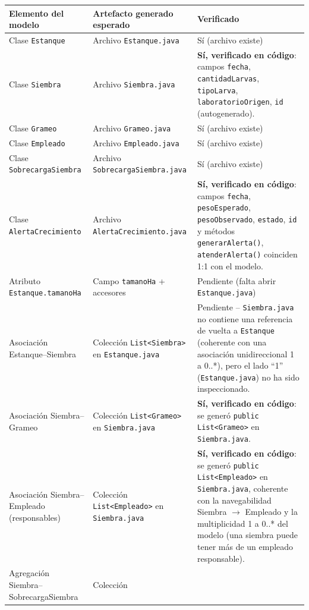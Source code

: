 \documentclass[11pt,a4paper]{article}
\begin{document}
\begin{center}
\begin{tabularx}{\linewidth}{>{\raggedright\arraybackslash}p{3.7cm}XX}
\toprule
\textbf{Elemento del modelo} & \textbf{Artefacto generado esperado} &
\textbf{Verificado} \\
\midrule
Clase \texttt{Estanque} & Archivo \texttt{Estanque.java} & Sí (archivo existe) \\
Clase \texttt{Siembra} & Archivo \texttt{Siembra.java} & \textbf{Sí, verificado
en código}: campos \texttt{fecha}, \texttt{cantidadLarvas}, \texttt{tipoLarva},
\texttt{laboratorioOrigen}, \texttt{id} (autogenerado). \\
Clase \texttt{Grameo} & Archivo \texttt{Grameo.java} & Sí (archivo existe) \\
Clase \texttt{Empleado} & Archivo \texttt{Empleado.java} & Sí (archivo existe) \\
Clase \texttt{SobrecargaSiembra} & Archivo \texttt{SobrecargaSiembra.java} &
Sí (archivo existe) \\
Clase \texttt{AlertaCrecimiento} & Archivo \texttt{AlertaCrecimiento.java} &
\textbf{Sí, verificado en código}: campos \texttt{fecha}, \texttt{pesoEsperado},
\texttt{pesoObservado}, \texttt{estado}, \texttt{id} y métodos
\texttt{generarAlerta()}, \texttt{atenderAlerta()} coinciden 1:1 con el modelo. \\
Atributo \texttt{Estanque.tamanoHa} & Campo \texttt{tamanoHa} + accesores &
Pendiente (falta abrir \texttt{Estanque.java}) \\
Asociación Estanque--Siembra & Colección \texttt{List<Siembra>} en
\texttt{Estanque.java} & Pendiente -- \texttt{Siembra.java} no contiene una
referencia de vuelta a \texttt{Estanque} (coherente con una asociación
unidireccional 1 a 0..*), pero el lado ``1'' (\texttt{Estanque.java}) no ha
sido inspeccionado. \\
Asociación Siembra--Grameo & Colección \texttt{List<Grameo>} en
\texttt{Siembra.java} & \textbf{Sí, verificado en código}: se generó
\texttt{public List<Grameo>} en \texttt{Siembra.java}. \\
Asociación Siembra--Empleado (responsables) & Colección \texttt{List<Empleado>}
en \texttt{Siembra.java} & \textbf{Sí, verificado en código}: se generó
\texttt{public List<Empleado>} en \texttt{Siembra.java}, coherente con la
navegabilidad Siembra $\rightarrow$ Empleado y la multiplicidad 1 a 0..* del
modelo (una siembra puede tener más de un empleado responsable). \\
Agregación Siembra--SobrecargaSiembra & Colección

\end{tabularx}
\end{center}
\end{document}
